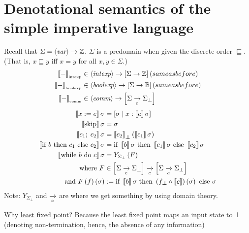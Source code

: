 \section{Denotational semantics of the simple imperative language}

\begin{enumcirc}
	\item
	Recall that $\Sigma = \left\langle \textit{var} \right\rangle \to \mathbb{Z}$.
	$\Sigma$ is a predomain when given the discrete order $\sqsubseteq$.
	(That is, $x \sqsubseteq y$ iff $x = y$ for all $x, y \in \Sigma$.)
	\begin{align*}
		\left\llbracket - \right\rrbracket_{\textrm{\tiny intexp}}  & \in \left\langle \textit{intexp} \right\rangle \to \left[ \Sigma \to \mathbb{Z} \right] (same as before)  \\
		\left\llbracket - \right\rrbracket_{\textrm{\tiny boolexp}} & \in \left\langle \textit{boolexp} \right\rangle \to \left[ \Sigma \to \mathbb{B} \right] (same as before) \\
		\left\llbracket - \right\rrbracket_{\textrm{\tiny comm}} & \in \left\langle \textit{comm} \right\rangle \to \left[ \Sigma \xrightarrow[c]{} \Sigma_\bot \right]
	\end{align*}
	\begin{align*}
		\left\llbracket x := e \right\rrbracket \sigma     & = \left[ \sigma \; \middle\vert \; x: \left\llbracket e \right\rrbracket \sigma \right]                                                        \\
		\left\llbracket \textrm{skip} \right\rrbracket \sigma             & = \sigma                                                                                       \\
		\left\llbracket c_1 ;\; c_2 \right\rrbracket \sigma    & = \left\llbracket c_2 \right\rrbracket_{\bot \mkern-11mu \bot} \left( \left\llbracket c_1 \right\rrbracket \sigma \right)                                    \\
		\left\llbracket \textrm{if } b \textrm{ then } c_1 \textrm{ else } c_2 \right\rrbracket \sigma  & = \textrm{if } \left\llbracket b \right\rrbracket \sigma \textrm{ then } \left\llbracket c_1 \right\rrbracket \sigma \textrm{ else } \left\llbracket c_2 \right\rrbracket \sigma                   \\
		\left\llbracket \textrm{while } b \textrm{ do } c \right\rrbracket \sigma      & = Y_{\Sigma_\bot} \left( F \right)                                                                    \\
		\textrm{ where } F                    & \in \left[ \Sigma \xrightarrow[c]{} \Sigma_\bot \right] \xrightarrow[c]{} \left[ \Sigma \xrightarrow[c]{} \Sigma_\bot \right]                 \\
		\textrm{and }F\left( f \right)\left( \sigma \right) & := \textrm{if } \left\llbracket b \right\rrbracket \sigma \textrm{ then } \left( f_{\bot \mkern-11mu \bot} \circ \left\llbracket c \right\rrbracket \right) \left( \sigma \right) \textrm{ else } \sigma
	\end{align*}
	Note: $Y_{\Sigma_\bot}$ and $\xrightarrow[c]{}$ are where we get something by using domain
	theory.
	\item
	Why \ul{least} fixed point?
	Because the least fixed point maps an input state to $\bot$
	(denoting non-termination, hence, the absence of any information)

\end{enumcirc}
